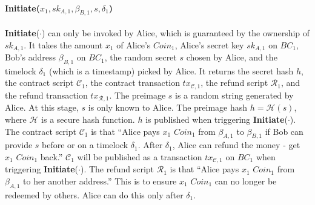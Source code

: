\paragraph{\textbf{Initiate}($x_1, sk_{A, 1}, \beta_{B, 1}, s, \delta_1$)}
\textbf{Initiate}($\cdot$) can only be invoked by Alice, which is guaranteed by the ownership of $sk_{A, 1}$.
It takes the amount $x_1$ of Alice's $Coin_1$,
Alice's secret key $sk_{A, 1}$ on $BC_1$,
Bob's address $\beta_{B, 1}$ on $BC_1$,
the random secret $s$ chosen by Alice,
and the timelock $\delta_1$ (which is a timestamp) picked by Alice.
It returns the secret hash $h$,
the contract script $\mathcal{C}_1$,
the contract transaction $tx_{\mathcal{C}, 1}$,
the refund script $\mathcal{R}_1$,
and the refund transaction $tx_{\mathcal{R}, 1}$.
The preimage $s$ is a random string generated by Alice. At this stage, $s$ is only known to Alice.
The preimage hash $h = \mathcal{H}(s)$, where $\mathcal{H}$ is a secure hash function.
$h$ is published when triggering \textbf{Initiate}($\cdot$).
The contract script $\mathcal{C}_1$ is that ``Alice pays $x_1$ $Coin_1$ from $\beta_{A, 1}$ to $\beta_{B, 1}$ if Bob can provide $s$ before or on a timelock $\delta_1$. After $\delta_1$, Alice can refund the money - get $x_1$ $Coin_1$ back.''
$\mathcal{C}_1$ will be published as a transaction $tx_{\mathcal{C}, 1}$ on $BC_1$ when triggering \textbf{Initiate}($\cdot$).
The refund script $\mathcal{R}_1$ is that ``Alice pays $x_1$ $Coin_1$ from $\beta_{A, 1}$ to her another address.'' This is to ensure $x_1$ $Coin_1$ can no longer be redeemed by others. Alice can do this only after $\delta_1$.

